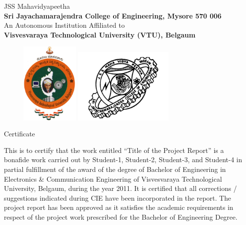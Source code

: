 %
\setlength{\toptafiddle}{1in}
\setlength{\bottafiddle}{1in}
\vspace*{-0.5in}
\enlargethispage{\bottafiddle}
\thispagestyle{empty}

\begin{center}\large JSS Mahavidyapeetha\\\textbf{Sri Jayachamarajendra College of Engineering, Mysore 570 006}\\
An Autonomous Institution Affiliated to\\
\textbf{Visvesvaraya Technological University (VTU), Belgaum}\\
\vspace{0.2cm}
\begin{figure}[h]
\centering
\includegraphics[height=4cm]{images/vtu.png}
\hspace{0.1\textwidth}
\includegraphics[height=3.7cm]{images/jcelogo.jpg}
\end{figure}
\Huge{Certificate}\end{center}

This is to certify that the work entitled ``Title of the Project Report'' is a bonafide work carried out by Student-1, Student-2, Student-3, and Student-4 in partial fulfillment of the award of the degree of Bachelor of Engineering in Electronics \& Communication Engineering of Visvesvaraya Technological University, Belgaum, during the year 2011. It is certified that all corrections / suggestions indicated during CIE have been incorporated in the report. The project report has been approved as it satisfies the academic requirements in respect of the project work prescribed for the Bachelor of Engineering Degree.

